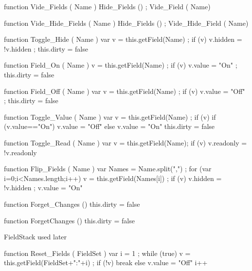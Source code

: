 function Vide_Fields ( Name )
  { Hide_Fields () ;
    Vide_Field ( Name) }

function Vide_Hide_Fields ( Name )
  { Hide_Fields () ;
    Vide_Hide_Field ( Name) }

function Toggle_Hide ( Name )
  { var v = this.getField(Name) ;
    if (v)
      { v.hidden = !v.hidden ;
        this.dirty = false } }

function Field_On ( Name )
  { v = this.getField(Name) ;
    if (v) { v.value = "On" ; this.dirty = false } }

function Field_Off ( Name )
  { var v = this.getField(Name) ;
    if (v) { v.value = "Off" ; this.dirty = false } }

function Toggle_Value ( Name )
  { var v = this.getField(Name) ;
    if (v)
      { if (v.value=="On")
          { v.value = "Off" }
        else
          { v.value = "On" } }
   this.dirty = false }

function Toggle_Read ( Name )
  { var v = this.getField(Name);
    if (v) { v.readonly = !v.readonly } }

function Flip_Fields ( Name )
  { var Names = Name.split(",") ;
    for (var i=0;i<Names.length;i++)
      { v = this.getField(Names[i]) ;
        if (v)
          { v.hidden = !v.hidden ;
            v.value = "On" } } }

function Forget_Changes ()
  { this.dirty = false }

function ForgetChanges ()
  { this.dirty = false }
\stopJSpreamble

%



\startJSpreamble FieldStack used later

function Reset_Fields ( FieldSet )
  { var i = 1 ;
    while (true)
      { v = this.getField(FieldSet+":"+i) ;
        if (!v)
          { break }
        else
          { v.value = "Off" }
        i++ } }

